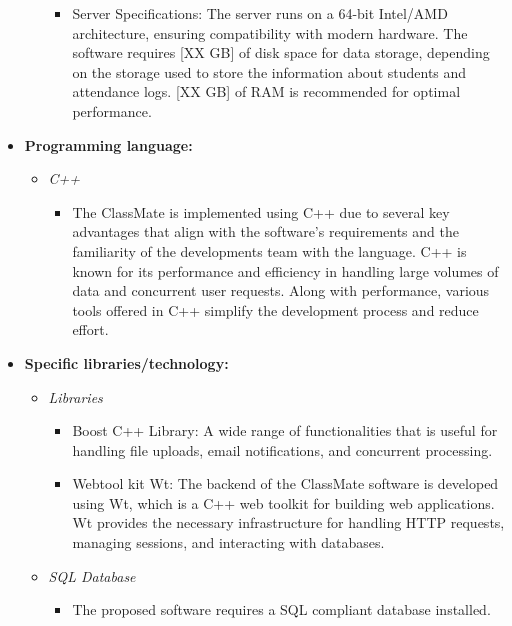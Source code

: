\documentclass[letterpaper,12pt,oneside,listof=totoc]{scrreprt}
\begin{document}
\begin{itemize}
\begin{itemize}
\begin{itemize}
                \item Server Specifications: The server runs on a 64-bit Intel/AMD architecture, ensuring compatibility with modern hardware. The software requires [XX GB] of disk space for data storage, depending on the storage used to store the information about students and attendance logs. [XX GB] of RAM is recommended for optimal performance.  
            \end{itemize}
            \end{itemize}
            \item \textbf{Programming language:}
                \begin{itemize}
                    \item \textit{C++}
                \begin{itemize}
                    \item The ClassMate is implemented using C++ due to several key advantages that align with the software's requirements and the familiarity of the developments team with the language. C++ is known for its performance and efficiency in handling large volumes of data and concurrent user requests. Along with performance, various tools offered in C++ simplify the development process and reduce effort.
                \end{itemize}
            \end{itemize}
            \item \textbf{Specific libraries/technology:}
                \begin{itemize}
                    \item \textit{Libraries}
                    \begin{itemize}
                        \item Boost C++ Library: A wide range of functionalities that is useful for handling file uploads, email notifications, and concurrent processing.
                        \item Webtool kit Wt: The backend of the ClassMate software is developed using Wt, which is a C++ web toolkit for building web applications. Wt provides the necessary infrastructure for handling HTTP requests, managing sessions, and interacting with databases.
                    \end{itemize}
                \end{itemize}
                \begin{itemize}
                    \item \textit{SQL Database}
                    \begin{itemize}
                        \item The proposed software requires a SQL compliant database installed.
                    \end{itemize}
                \end{itemize}
            \end{itemize}
\end{document}
